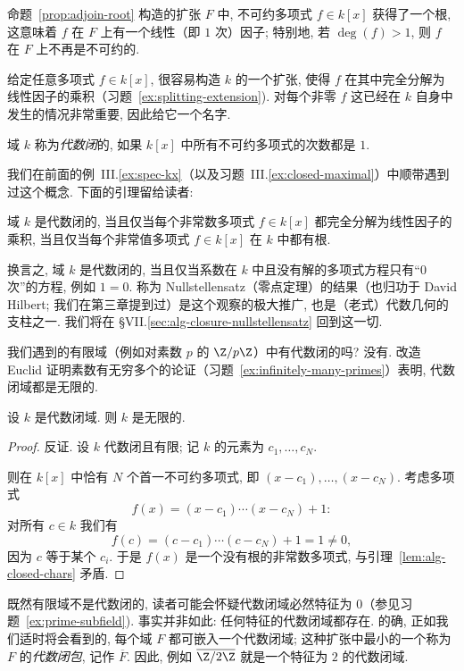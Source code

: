 命题~\ref{prop:adjoin-root} 构造的扩张 $F$ 中, 不可约多项式 $f\in k[x]$ 获得了一个根, 这意味着 $f$ 在 $F$ 上有一个线性（即 $1$ 次）因子; 特别地, 若 $\deg(f)>1$, 则 $f$ 在 $F$ 上不再是不可约的.

给定任意多项式 $f\in k[x]$, 很容易构造 $k$ 的一个扩张, 使得 $f$ 在其中完全分解为线性因子的乘积（习题~\ref{ex:splitting-extension}). 对每个非零 $f$ 这已经在 $k$ 自身中发生的情况非常重要, 因此给它一个名字.

\begin{definition}\label{def:alg-closed}
域 $k$ 称为\emph{代数闭}的, 如果 $k[x]$ 中所有不可约多项式的次数都是 $1$.
\end{definition}

我们在前面的例~III.\ref{ex:spec-kx}（以及习题~III.\ref{ex:closed-maximal}）中顺带遇到过这个概念. 下面的引理留给读者:

\begin{lemma}\label{lem:alg-closed-chars}
域 $k$ 是代数闭的, 当且仅当每个非常数多项式 $f\in k[x]$ 都完全分解为线性因子的乘积, 当且仅当每个非常值多项式 $f\in k[x]$ 在 $k$ 中都有根.
\end{lemma}

换言之, 域 $k$ 是代数闭的, 当且仅当系数在 $k$ 中且没有解的多项式方程只有``$0$ 次''的方程, 例如 $1=0$. 称为 Nullstellensatz（零点定理）的结果（也归功于 David Hilbert; 我们在第三章提到过）是这个观察的极大推广, 也是（老式）代数几何的支柱之一. 我们将在 \S VII.\ref{sec:alg-closure-nullstellensatz} 回到这一切.

我们遇到的有限域（例如对素数 $p$ 的 $\Z/p\Z$）中有代数闭的吗? 没有. 改造 Euclid 证明素数有无穷多个的论证（习题~\ref{ex:infinitely-many-primes}）表明, 代数闭域都是无限的.

\begin{proposition}\label{prop:alg-closed-infinite}
设 $k$ 是代数闭域. 则 $k$ 是无限的.
\end{proposition}

\begin{proof}
反证. 设 $k$ 代数闭且有限; 记 $k$ 的元素为 $c_1,\ldots,c_N$.

则在 $k[x]$ 中恰有 $N$ 个首一不可约多项式, 即 $(x-c_1),\ldots,(x-c_N)$. 考虑多项式
\[
f(x)=(x-c_1)\cdots(x-c_N)+1:
\]
对所有 $c\in k$ 我们有
\[
f(c)=(c-c_1)\cdots(c-c_N)+1=1\neq 0,
\]
因为 $c$ 等于某个 $c_i$. 于是 $f(x)$ 是一个没有根的非常数多项式, 与引理~\ref{lem:alg-closed-chars} 矛盾.
\end{proof}

既然有限域不是代数闭的, 读者可能会怀疑代数闭域必然特征为 $0$（参见习题~\ref{ex:prime-subfield}). 事实并非如此: 任何特征的代数闭域都存在. 的确, 正如我们适时将会看到的, 每个域 $F$ 都可嵌入一个代数闭域; 这种扩张中最小的一个称为 $F$ 的\emph{代数闭包}, 记作 $\overline{F}$. 因此, 例如 $\overline{\Z/2\Z}$ 就是一个特征为 $2$ 的代数闭域.

